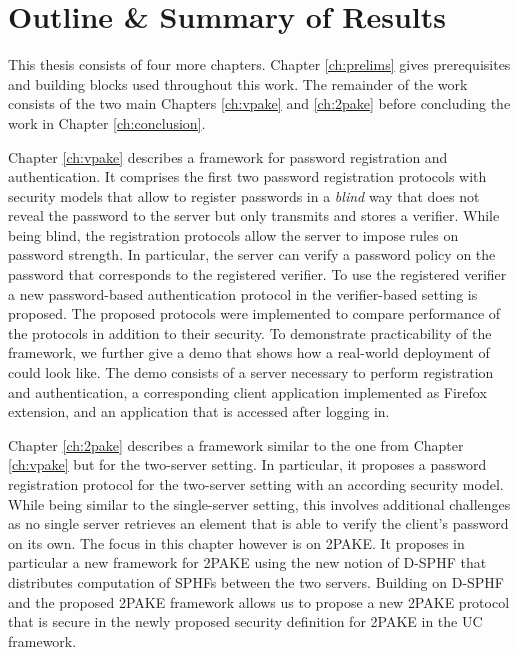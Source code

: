 \section{Outline \& Summary of Results}\label{sec:intro:outline}
This thesis consists of four more chapters.
Chapter \ref{ch:prelims} gives prerequisites and building blocks used throughout this work.
The remainder of the work consists of the two main Chapters \ref{ch:vpake} and \ref{ch:2pake} before concluding the work in Chapter \ref{ch:conclusion}.

Chapter \ref{ch:vpake} describes a framework for password registration and authentication.
It comprises the first two password registration protocols with security models that allow to register passwords in a \emph{blind} way that does not reveal the password to the server but only transmits and stores a verifier.
While being blind, the registration protocols allow the server to impose rules on password strength.
In particular, the server can verify a password policy on the password that corresponds to the registered verifier.
To use the registered verifier a new password-based authentication protocol in the verifier-based setting is proposed.
The proposed protocols were implemented to compare performance of the protocols in addition to their security.
To demonstrate practicability of the framework, we further give a demo that shows how a real-world deployment of could look like.
The demo consists of a server necessary to perform registration and authentication, a corresponding client application implemented as Firefox extension, and an application that is accessed after logging in.

Chapter \ref{ch:2pake} describes a framework similar to the one from Chapter \ref{ch:vpake} but for the two-server setting.
In particular, it proposes a password registration protocol for the two-server setting with an according security model.
While being similar to the single-server setting, this involves additional challenges as no single server retrieves an element that is able to verify the client's password on its own.
The focus in this chapter however is on \ac{2PAKE}.
It proposes in particular a new framework for \ac{2PAKE} using the new notion of \ac{D-SPHF} that distributes computation of \acp{SPHF} between the two servers.
Building on \ac{D-SPHF} and the proposed \ac{2PAKE} framework allows us to propose a new \ac{2PAKE} protocol that is secure in the newly proposed security definition for \ac{2PAKE} in the \ac{UC} framework.



